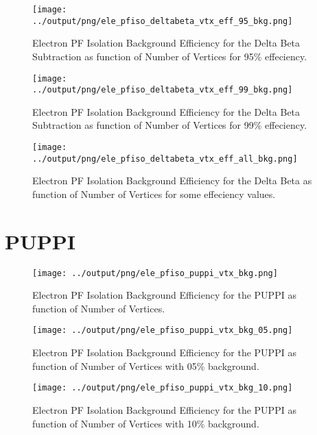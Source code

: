 \documentclass[11pt]{book}
\begin{document}
\begin{figure}[htb]
\centering
\texttt{[image: ../output/png/ele\_pfiso\_deltabeta\_vtx\_eff\_95\_bkg.png]}
\caption{Electron PF Isolation Background Efficiency for the Delta Beta Subtraction as function of Number of Vertices for 95\% effeciency.}
\label{fig:ele_pfiso_vtx_eff_deltabeta_eff_95_bkg}
\end{figure}

\begin{figure}[htb]
\centering
\texttt{[image: ../output/png/ele\_pfiso\_deltabeta\_vtx\_eff\_99\_bkg.png]}
\caption{Electron PF Isolation Background Efficiency for the Delta Beta Subtraction as function of Number of Vertices for 99\% effeciency.}
\label{fig:ele_pfiso_vtx_eff_deltabeta_eff_99_bkg}
\end{figure}

\begin{figure}[htb]
\centering
\texttt{[image: ../output/png/ele\_pfiso\_deltabeta\_vtx\_eff\_all\_bkg.png]}
\caption{Electron PF Isolation Background Efficiency for the Delta Beta as function of Number of Vertices for some effeciency values.}
\label{fig:ele_pfiso_vtx_eff_deltabeta_eff_all_bkg}
\end{figure}
\clearpage

\section{PUPPI}
\begin{figure}[htb]
\centering
\texttt{[image: ../output/png/ele\_pfiso\_puppi\_vtx\_bkg.png]}
\caption{Electron PF Isolation Background Efficiency for the PUPPI as function of Number of Vertices.}
\label{fig:ele_pfiso_vtx_bgk_puppi}
\end{figure}

\begin{figure}[htb]
\centering
\texttt{[image: ../output/png/ele\_pfiso\_puppi\_vtx\_bkg\_05.png]}
\caption{Electron PF Isolation Background Efficiency for the PUPPI as function of Number of Vertices with 05\% background.}
\label{fig:ele_pfiso_vtx_bkg_puppi_bkg_05}
\end{figure}

\begin{figure}[htb]
\centering
\texttt{[image: ../output/png/ele\_pfiso\_puppi\_vtx\_bkg\_10.png]}
\caption{Electron PF Isolation Background Efficiency for the PUPPI as function of Number of Vertices with 10\% background.}
\label{fig:ele_pfiso_vtx_bkg_puppi_bkg_10}
\end{figure}
\end{document}
